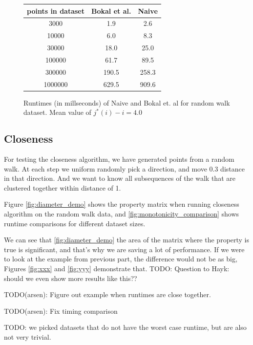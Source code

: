 \documentclass{article}
\begin{document}
\begin{figure}[!ht]
    \centering
	\begin{tabular}{c|c|c}
	    points in dataset   & Bokal et al. & Naive  \\
	\hline
	    3000    & 1.9    & 2.6  \\
	\hline
	    10000    & 6.0    & 8.3  \\
	\hline
	    30000    & 18.0    & 25.0  \\
	\hline
	    100000    & 61.7    & 89.5  \\
	\hline
	    300000    & 190.5    & 258.3  \\
	\hline
	    1000000    & 629.5    & 909.6 
	\end{tabular}
    \caption{Runtimes (in millseconds) of Naive and Bokal et. al for random walk dataset. Mean value of $j^*(i) - i = 4.0$}
    \label{fig:monotonicity_comparison_random_walk}
\end{figure}

\subsection{Closeness}

For testing the closeness algorithm, we have generated points from a random walk.
At each step we uniform randomly pick a direction, and move 0.3
distance in that direction. And we want to know all subsequences
of the walk that are clustered together within distance of 1.

Figure \ref{fig:diameter_demo} shows the property matrix when running
closeness algorithm on the random walk data, and
\ref{fig:monotonicity_comparison} shows runtime comparisons for
different dataset sizes.

We can see that \ref{fig:diameter_demo} the area of the matrix where
the property is true is significant, and that's why we are saving
a lot of performance. If we were to look at the example from previous
part, the difference would not be as big, Figures \ref{fig:xxx} and
\ref{fig:yyy} demonstrate that. TODO: Question to Hayk: should we even show more results like this??

TODO(arsen): Figure out example when runtimes are close together.

TODO(arsen): Fix timing comparison 

TODO: we picked datasets that do not have the worst case runtime, but are also not very trivial.
\end{document}

